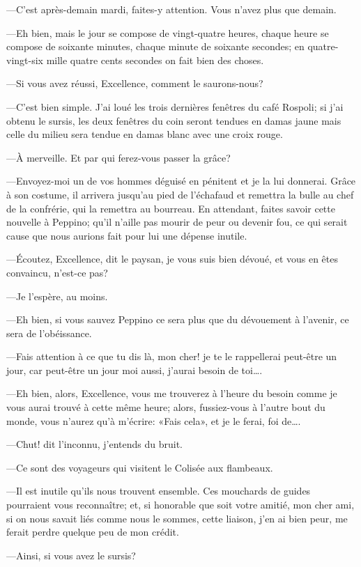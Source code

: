 —C'est après-demain mardi, faites-y attention. Vous n'avez plus que demain. 

—Eh bien, mais le jour se compose de vingt-quatre heures, chaque heure se compose de soixante minutes, chaque minute de soixante secondes; en quatre-vingt-six mille quatre cents secondes on fait bien des choses. 

—Si vous avez réussi, Excellence, comment le saurons-nous?  

—C'est bien simple. J'ai loué les trois dernières fenêtres du café Rospoli; si j'ai obtenu le sursis, les deux fenêtres du coin seront tendues en damas jaune mais celle du milieu sera tendue en damas blanc avec une croix rouge. 

—À merveille. Et par qui ferez-vous passer la grâce? 

—Envoyez-moi un de vos hommes déguisé en pénitent et je la lui donnerai. Grâce à son costume, il arrivera jusqu'au pied de l'échafaud et remettra la bulle au chef de la confrérie, qui la remettra au bourreau. En attendant, faites savoir cette nouvelle à Peppino; qu'il n'aille pas mourir de peur ou devenir fou, ce qui serait cause que nous aurions fait pour lui une dépense inutile.  

—Écoutez, Excellence, dit le paysan, je vous suis bien dévoué, et vous en êtes convaincu, n'est-ce pas? 

—Je l'espère, au moins. 

—Eh bien, si vous sauvez Peppino ce sera plus que du dévouement à l'avenir, ce sera de l'obéissance. 

—Fais attention à ce que tu dis là, mon cher! je te le rappellerai peut-être un jour, car peut-être un jour moi aussi, j'aurai besoin de toi\dots. 

—Eh bien, alors, Excellence, vous me trouverez à l'heure du besoin comme je vous aurai trouvé à cette même heure; alors, fussiez-vous à l'autre bout du monde, vous n'aurez qu'à m'écrire: «Fais cela», et je le ferai, foi de\dots. 

—Chut! dit l'inconnu, j'entends du bruit. 

—Ce sont des voyageurs qui visitent le Colisée aux flambeaux. 

—Il est inutile qu'ils nous trouvent ensemble. Ces mouchards de guides pourraient vous reconnaître; et, si honorable que soit votre amitié, mon cher ami, si on nous savait liés comme nous le sommes, cette liaison, j'en ai bien peur, me ferait perdre quelque peu de mon crédit. 

—Ainsi, si vous avez le sursis? 

